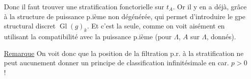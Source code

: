 Donc il faut trouver une stratification fonctorielle sur $t_A$. Or il y en a déjà, grâce à la structure de puissance p.ième non dégénérée, qui permet d'introduire le gpe structural discret $\operatorname{Gl}(g)_k$.  Et c'est la seule, comme on voit aisément en utilisant la compatibilité avec la puissance p.ième (pour $\Lambda$, $A$ sur $\Lambda$, donnés).

\uline{Remarque} On voit donc que la position de la filtration p.r. à la stratification ne peut aucunement donner un principe de classification  infinitésimale en car. $p>0$ !

